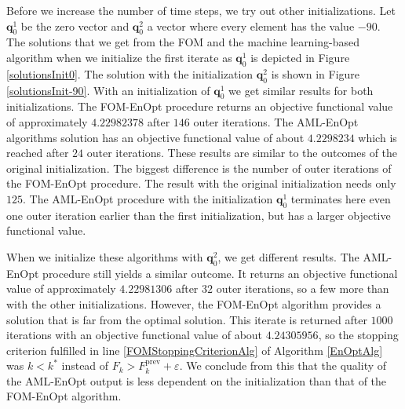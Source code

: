 Before we increase the number of time steps, we try out other initializations. Let $\mathbf{q}^1_0$ be the zero vector and $\mathbf{q}^2_0$ a vector where every element has the value $-90$. The solutions that we get from the FOM and the machine learning-based algorithm when we initialize the first iterate as $\mathbf{q}^1_0$ is depicted in Figure \ref{solutionsInit0}. The solution with the initialization $\mathbf{q}^2_0$ is shown in Figure \ref{solutionsInit-90}. With an initialization of $\mathbf{q}^1_0$ we get similar results for both initializations. The FOM-EnOpt procedure returns an objective functional value of approximately $4.22982378$ after $146$ outer iterations. The AML-EnOpt algorithms solution has an objective functional value of about $4.2298234$ which is reached after $24$ outer iterations. These results are similar to the outcomes of the original initialization. The biggest difference is the number of outer iterations of the FOM-EnOpt procedure. The result with the original initialization needs only $125$. The AML-EnOpt procedure with the initialization $\mathbf{q}^1_0$ terminates here even one outer iteration earlier than the first initialization, but has a larger objective functional value.

When we initialize these algorithms with $\mathbf{q}^2_0$, we get different results. The AML-EnOpt procedure still yields a similar outcome. It returns an objective functional value of approximately $4.22981306$ after $32$ outer iterations, so a few more than with the other initializations. However, the FOM-EnOpt algorithm provides a solution that is far from the optimal solution. This iterate is returned after $1000$ iterations with an objective functional value of about $4.24305956$, so the stopping criterion fulfilled in line \ref{FOMStoppingCriterionAlg} of Algorithm \ref{EnOptAlg} was $k<k^*$ instead of $F_{k}>F^\mathrm{prev}_k+\varepsilon$. We conclude from this that the quality of the AML-EnOpt output is less dependent on the initialization than that of the FOM-EnOpt algorithm.\\


